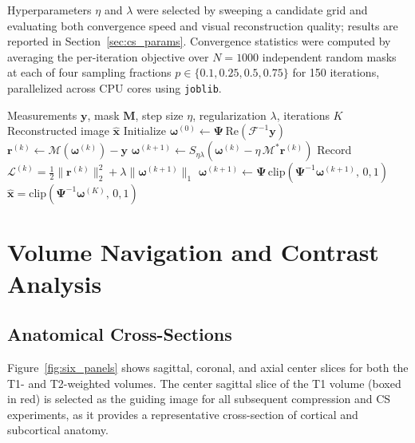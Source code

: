 \documentclass[10pt]{article}
\begin{document}
Hyperparameters $\eta$ and $\lambda$ were selected by sweeping a candidate
grid and evaluating both convergence speed and visual reconstruction quality;
results are reported in Section~\ref{sec:cs_params}. Convergence statistics
were computed by averaging the per-iteration objective over $N=1000$
independent random masks at each of four sampling fractions
$p \in \{0.1, 0.25, 0.5, 0.75\}$ for 150 iterations, parallelized across
CPU cores using \texttt{joblib}.
\begin{algorithm}
\caption{ISTA with Wavelet Sparsity for CS-MRI}
\label{alg:ista}
\begin{algorithmic}[1]
\Require Measurements $\mathbf{y}$, mask $\mathbf{M}$, step size $\eta$, regularization $\lambda$, iterations $K$
\Ensure  Reconstructed image $\hat{\mathbf{x}}$
\State Initialize $\boldsymbol{\omega}^{(0)} \leftarrow \boldsymbol{\Psi}\,\mathrm{Re}\!\left(\mathcal{F}^{-1}\mathbf{y}\right)$
  \State $\mathbf{r}^{(k)} \leftarrow \mathcal{M}\!\left(\boldsymbol{\omega}^{(k)}\right) - \mathbf{y}$
  \State $\boldsymbol{\omega}^{(k+1)} \leftarrow S_{\eta\lambda}\!\left(\boldsymbol{\omega}^{(k)} - \eta\,\mathcal{M}^*\mathbf{r}^{(k)}\right)$
  \State Record $\mathcal{L}^{(k)} = \tfrac{1}{2}\|\mathbf{r}^{(k)}\|_2^2 + \lambda\|\boldsymbol{\omega}^{(k+1)}\|_1$
  \State $\boldsymbol{\omega}^{(k+1)} \leftarrow \boldsymbol{\Psi}\,\mathrm{clip}\!\left(\boldsymbol{\Psi}^{-1}\boldsymbol{\omega}^{(k+1)},\,0,1\right)$
\EndFor
\State \Return $\hat{\mathbf{x}} = \mathrm{clip}\!\left(\boldsymbol{\Psi}^{-1}\boldsymbol{\omega}^{(K)},\,0,1\right)$
\end{algorithmic}
\end{algorithm}


\section{Volume Navigation and Contrast Analysis}
\label{sec:volumes}

\subsection{Anatomical Cross-Sections}

Figure~\ref{fig:six_panels} shows sagittal, coronal, and axial center slices
for both the T1- and T2-weighted volumes.  The center sagittal slice of the
T1 volume (boxed in red) is selected as the guiding image for all subsequent
compression and CS experiments, as it provides a representative cross-section
of cortical and subcortical anatomy.
\end{document}

